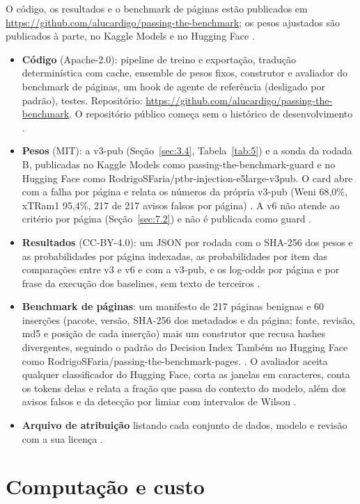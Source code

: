 \documentclass[11pt]{article}
\begin{document}
O código, os resultados e o benchmark de páginas estão publicados em \url{https://github.com/alucardigo/passing-the-benchmark}; os pesos ajustados são publicados à parte, no Kaggle Models e no Hugging Face%
.

\begin{itemize}
\item \textbf{Código} (Apache-2.0): pipeline de treino e exportação, tradução determinística com cache, ensemble de pesos fixos, construtor e avaliador do benchmark de páginas, um hook de agente de referência (desligado por padrão), testes. Repositório: \url{https://github.com/alucardigo/passing-the-benchmark}. O repositório público começa sem o histórico de desenvolvimento%
.
\item \textbf{Pesos} (MIT): a v3-pub (Seção~\ref{sec:3.4}, Tabela~\ref{tab:5}) e a sonda da rodada B, publicadas no Kaggle Models como passing-the-benchmark-guard e no Hugging Face como RodrigoSFaria/ptbr-injection-e5large-v3pub. O card abre com a falha por página e relata os números da própria v3-pub (Weni 68,0\%, xTRam1 95,4\%, 217 de 217 avisos falsos por página)%
. A v6 não atende ao critério por página (Seção~\ref{sec:7.2}) e não é publicada como guard%
.
\item \textbf{Resultados} (CC-BY-4.0): um JSON por rodada com o SHA-256 dos pesos e as probabilidades por página indexadas, as probabilidades por item das comparações entre v3 e v6 e com a v3-pub, e os log-odds por página e por frase da execução dos baselines, sem texto de terceiros%
.
\item \textbf{Benchmark de páginas}: um manifesto de 217 páginas benignas e 60 inserções (pacote, versão, SHA-256 dos metadados e da página; fonte, revisão, md5 e posição de cada inserção) mais um construtor que recusa hashes divergentes, seguindo o padrão do Decision Index Também no Hugging Face como RodrigoSFaria/passing-the-benchmark-pages.%
. O avaliador aceita qualquer classificador do Hugging Face, corta as janelas em caracteres, conta os tokens delas e relata a fração que passa do contexto do modelo, além dos avisos falsos e da detecção por limiar com intervalos de Wilson%
.
\item \textbf{Arquivo de atribuição} listando cada conjunto de dados, modelo e revisão com a sua licença%
.
\end{itemize}




\appendix

\section{Computação e custo}\label{app:A}
\end{document}
